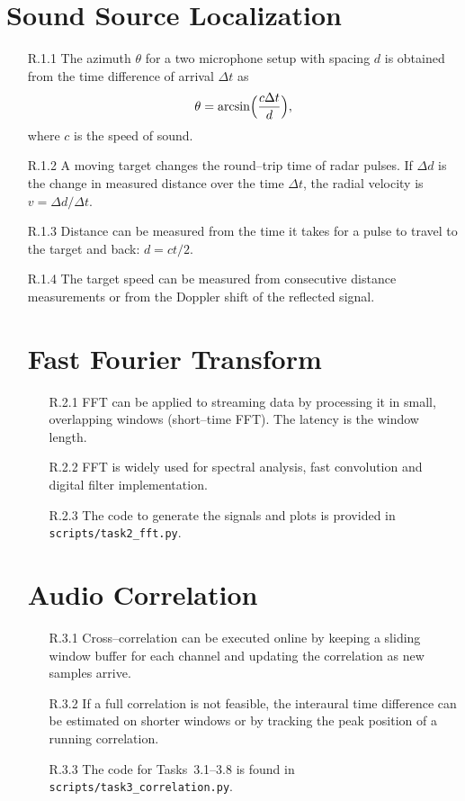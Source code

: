 \documentclass{article}
\begin{document}
\section{Sound Source Localization}
\begin{enumerate}
\item[R.1.1] The azimuth $\theta$ for a two microphone setup with spacing $d$ is obtained from the time difference of arrival $\Delta t$ as
\[\theta = \arcsin\Bigl(\frac{c \Delta t}{d}\Bigr),\]
where $c$ is the speed of sound.
\item[R.1.2] A moving target changes the round--trip time of radar pulses. If $\Delta d$ is the change in measured distance over the time $\Delta t$, the radial velocity is $v = \Delta d/\Delta t$.
\item[R.1.3] Distance can be measured from the time it takes for a pulse to travel to the target and back: $d=c t/2$.
\item[R.1.4] The target speed can be measured from consecutive distance measurements or from the Doppler shift of the reflected signal.
\section{Fast Fourier Transform}
\begin{enumerate}
\item[R.2.1] FFT can be applied to streaming data by processing it in small, overlapping windows (short--time FFT). The latency is the window length.
\item[R.2.2] FFT is widely used for spectral analysis, fast convolution and digital filter implementation.
\item[R.2.3] The code to generate the signals and plots is provided in \texttt{scripts/task2\_fft.py}.
\end{enumerate}

\section{Audio Correlation}
\begin{enumerate}
\item[R.3.1] Cross--correlation can be executed online by keeping a sliding window buffer for each channel and updating the correlation as new samples arrive.
\item[R.3.2] If a full correlation is not feasible, the interaural time difference can be estimated on shorter windows or by tracking the peak position of a running correlation.
\item[R.3.3] The code for Tasks~3.1--3.8 is found in \texttt{scripts/task3\_correlation.py}.
\end{enumerate}


\end{enumerate}
\end{document}
